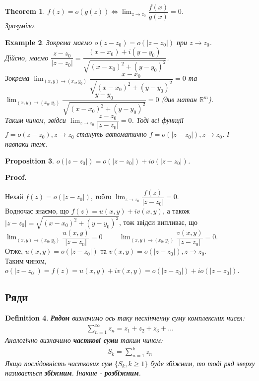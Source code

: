 \documentclass[a4paper, 10pt]{article}
\makeatletter
\def\qed{$\blacksquare$}
\theoremstyle{theoremdd}
\newtheorem{theorem}{Theorem}[subsection]
\theoremstyle{theoremdd}
\newtheorem{definition}[theorem]{Definition}
\theoremstyle{theoremdd}
\theoremstyle{theoremdd}
\newtheorem{example}[theorem]{Example}
\theoremstyle{theoremdd}
\newtheorem{proposition}[theorem]{Proposition}
\theoremstyle{theoremdd}
\theoremstyle{theoremdd}
\theoremstyle{theoremdd}
\renewenvironment{proof}[1][Proof.\\]{\par
\pushQED{\hfill \qed}%
\normalfont \topsep6\p@\@plus6\p@\relax
\trivlist
\item\relax
{\bfseries
#1\@addpunct{.}}\hspace\labelsep\ignorespaces
}{%
\popQED\endtrivlist\@endpefalse
}
\makeatother
\begin{document}
\begin{theorem}
$f(z) = o(g(z)) \iff \displaystyle\lim_{z \to z_0} \dfrac{f(x)}{g(x)} = 0$.\\
\textit{Зрозуміло.}
\end{theorem}

\begin{example}
Зокрема маємо $o(z-z_0) = o(|z-z_0|)$ при $z \to z_0$.\\
Дійсно, маємо $\dfrac{z-z_0}{|z-z_0|} = \dfrac{(x-x_0) + i(y-y_0)}{\sqrt{(x-x_0)^2 + (y-y_0)^2}}$.\\
Зокрема $\displaystyle\lim_{(x,y) \to (x_0,y_0)} \dfrac{x-x_0}{\sqrt{(x-x_0)^2 + (y-y_0)^2}} = 0$ та $\displaystyle\lim_{(x,y) \to (x_0,y_0)} \dfrac{y-y_0}{\sqrt{(x-x_0)^2 + (y-y_0)^2}} = 0$ (див матан $\mathbb{R}^m$).\\
Таким чином, звідси $\displaystyle\lim_{z \to z_0} \dfrac{z-z_0}{|z-z_0|} = 0$. Тоді всі функції $f = o(z-z_0), z \to z_0$ стануть автоматично $f = o(|z-z_0|), z \to z_0$. І навпаки теж.
\end{example}

\begin{proposition}
$o(|z-z_0|) = o(|z-z_0|) + io(|z-z_0|)$.
\end{proposition}

\begin{proof}
Нехай $f(z) = o(|z-z_0|)$, тобто $\displaystyle\lim_{z \to z_0} \dfrac{f(z)}{|z-z_0|} = 0$.\\
Водночас знаємо, що $f(z) = u(x,y) + iv(x,y)$, а також $|z-z_0| = \sqrt{(x-x_0)^2+ (y-y_0)^2}$, тож звідси випливає, що\\
$\displaystyle\lim_{(x,y) \to (x_0,y_0)} \dfrac{u(x,y)}{|z-z_0|} = 0 \hspace{1cm} \lim_{(x,y) \to (x_0,y_0)} \dfrac{v(x,y)}{|z-z_0|} = 0$.\\
Отже, $u(x,y) = o(|z-z_0|)$ та $v(x,y) = o(|z-z_0|), z \to z_0$.\\
Таким чином, $o(|z-z_0|) = f(z) = u(x,y) + iv(x,y) = o(|z-z_0|) + io(|z-z_0|)$.
\end{proof}

\subsection{Ряди}
\begin{definition}
\textbf{Рядом} визначимо ось таку нескінченну суму комплексних чисел:\\
\begin{align*}
\sum_{n=1}^\infty z_n = z_1 + z_2 + z_3 + \dots
\end{align*}
Аналогічно визначимо \textbf{часткові суми} таким чином:
\begin{align*}
S_k = \sum_{n=1}^k z_n
\end{align*}
Якщо послідовність часткових сум $\{S_k, k \geq 1\}$ буде збіжним, то тоді ряд зверху називається \textbf{збіжним}. Інакше - \textbf{розбіжним}.
\end{definition}
\end{document}
